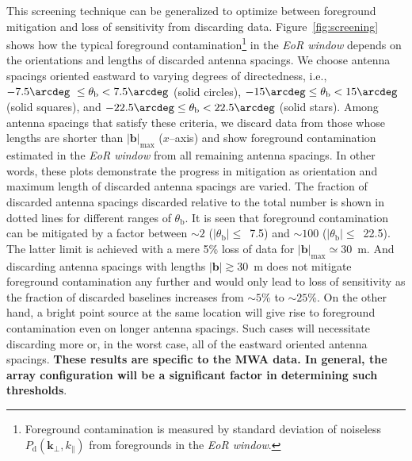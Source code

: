 \documentclass[preprint2,iop,numberedappendix]{emulateapj}
\begin{document}
This screening technique can be generalized to optimize between foreground mitigation and loss of sensitivity from discarding data. Figure~\ref{fig:screening} shows how the typical foreground contamination\footnote{Foreground contamination is measured by standard deviation of noiseless $P_\textrm{d}(\boldsymbol{k}_\perp,k_\parallel)$ from foregrounds in the {\it EoR window}.} in the {\it EoR window} depends on the orientations and lengths of discarded antenna spacings. We choose antenna spacings oriented eastward to varying degrees of directedness, i.e., $-7.5\arcdeg~\le\theta_\textrm{b} < 7.5\arcdeg$ (solid circles), $-15\arcdeg\le\theta_\textrm{b}< 15\arcdeg$ (solid squares), and $-22.5\arcdeg\le\theta_\textrm{b}< 22.5\arcdeg$ (solid stars). Among antenna spacings that satisfy these criteria, we discard data from those whose lengths are shorter than $|\boldsymbol{b}|_\textrm{max}$ ($x$--axis) and show foreground contamination estimated in the {\it EoR window} from all remaining antenna spacings. In other words, these plots demonstrate the progress in mitigation as orientation and maximum length of discarded antenna spacings are varied. %
The fraction of discarded antenna spacings discarded relative to the total number is shown in dotted lines for different ranges of $\theta_\textrm{b}$. It is seen that foreground contamination can be mitigated by a factor between $\sim 2$ ($|\theta_\textrm{b}|\le$~7.5\arcdeg) and $\sim 100$ ($|\theta_\textrm{b}|\le$~22.5\arcdeg). The latter limit is achieved with a mere 5\% loss of data for $|\boldsymbol{b}|_\textrm{max}\simeq30$~m. And discarding antenna spacings with lengths $|\boldsymbol{b}|\gtrsim 30$~m does not mitigate foreground contamination any further and would only lead to loss of sensitivity as the fraction of discarded baselines increases from $\sim 5$\% to $\sim 25$\%. On the other hand, a bright point source at the same location will give rise to foreground contamination even on longer antenna spacings. Such cases will necessitate discarding more or, in the worst case, all of the eastward oriented antenna spacings. {\bf These results are specific to the MWA data. In general, the array configuration will be a significant factor in determining such thresholds}.
\end{document}
